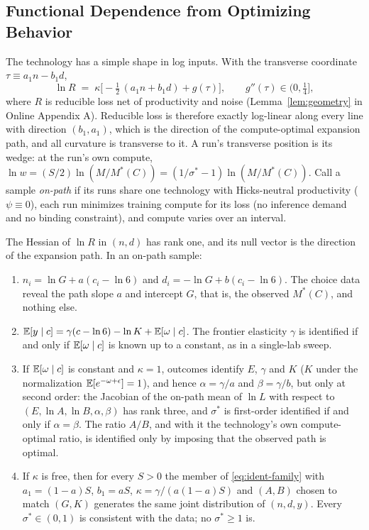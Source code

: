 \subsection{Functional Dependence from Optimizing Behavior}\label{sec:ident-fdep}

The technology has a simple shape in log inputs. With the transverse coordinate $\tau\equiv a_1n-b_1d$,
\begin{equation}\label{eq:ident-geometry}
\ln R \;=\; \kappa\Big[-\tfrac12\,(a_1n+b_1d)+g(\tau)\Big],\qquad g''(\tau)\in\big(0,\tfrac14\big],
\end{equation}
where $R$ is reducible loss net of productivity and noise (Lemma~\ref{lem:geometry} in Online Appendix A). Reducible loss is
therefore exactly log-linear along every line with direction $(b_1,a_1)$, which is the direction of the compute-optimal
expansion path, and all curvature is transverse to it. A run's transverse position is its wedge: at the run's own compute,
$\ln w=(S/2)\ln(M/M^*(C))=(1/\sigma^*-1)\ln(M/M^*(C))$. Call a sample \emph{on-path} if its runs share one technology
with Hicks-neutral productivity ($\psi\equiv0$), each run minimizes training compute for its loss (no inference demand
and no binding constraint), and compute varies over an interval.

\begin{proposition}\label{prop:fdep}
The Hessian of $\ln R$ in $(n,d)$ has rank one, and its null vector is the direction of the expansion path. In an
on-path sample:
\begin{enumerate}
\item[(i)] $n_i=\ln G+a(c_i-\ln6)$ and $d_i=-\ln G+b(c_i-\ln6)$. The choice data reveal the path slope $a$ and intercept
$G$, that is, the observed $M^*(C)$, and nothing else.
\item[(ii)] $\mathbb{E}[y\mid c]=\gamma(c-\ln6)-\ln K+\mathbb{E}[\omega\mid c]$. The frontier elasticity $\gamma$ is identified if and
only if $\mathbb{E}[\omega\mid c]$ is known up to a constant, as in a single-lab sweep.
\item[(iii)] If $\mathbb{E}[\omega\mid c]$ is constant and $\kappa=1$, outcomes identify $E$, $\gamma$ and $K$ ($K$ under the
normalization $\mathbb{E}[e^{-\omega+\epsilon}]=1$), and hence $\alpha=\gamma/a$ and $\beta=\gamma/b$, but only at second order: the Jacobian of the on-path mean of $\ln L$ with respect
to $(E,\ln A,\ln B,\alpha,\beta)$ has rank three, and $\sigma^*$ is first-order identified if and only if
$\alpha=\beta$. The ratio $A/B$, and with it the technology's own compute-optimal ratio, is identified only by imposing
that the observed path is optimal.
\item[(iv)] If $\kappa$ is free, then for every $S>0$ the member of \eqref{eq:ident-family} with $a_1=(1-a)S$, $b_1=aS$,
$\kappa=\gamma/(a(1-a)S)$ and $(A,B)$ chosen to match $(G,K)$ generates the same joint distribution of $(n,d,y)$. Every
$\sigma^*\in(0,1)$ is consistent with the data; no $\sigma^*\ge1$ is.
\end{enumerate}
\end{proposition}

